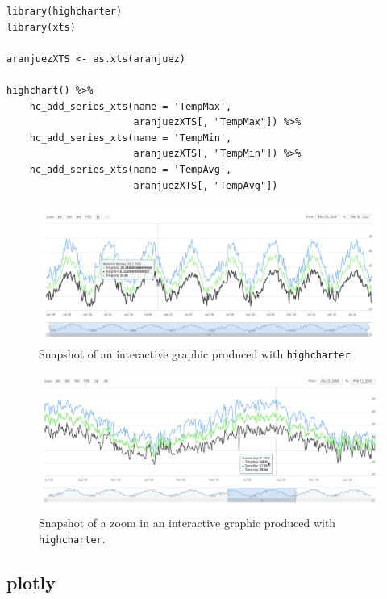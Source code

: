 \documentclass[smallroyalvopaper]{memoir}
\begin{document}
\lstset{language=r,label= ,caption= ,captionpos=b,numbers=none}
\begin{lstlisting}
library(highcharter)
library(xts)

aranjuezXTS <- as.xts(aranjuez)

highchart() %>%
    hc_add_series_xts(name = 'TempMax',
                      aranjuezXTS[, "TempMax"]) %>%
    hc_add_series_xts(name = 'TempMin',
                      aranjuezXTS[, "TempMin"]) %>%
    hc_add_series_xts(name = 'TempAvg',
                      aranjuezXTS[, "TempAvg"])

\end{lstlisting}

\begin{figure}[htbp]
\centering
\includegraphics[width=.9\linewidth]{figs/highcharter_aranjuez.png}
\caption{Snapshot of an interactive graphic produced with \texttt{highcharter}. \label{fig:highcharter}}
\end{figure}

\begin{figure}[htbp]
\centering
\includegraphics[width=.9\linewidth]{figs/highcharter_aranjuez_zoom.png}
\caption{Snapshot of a zoom in an interactive graphic produced with \texttt{highcharter}. \label{fig:highcharter_zoom}}
\end{figure}



\subsection{plotly \label{sec:plotly_horizontal}}
\label{sec:org107af49}
\end{document}
